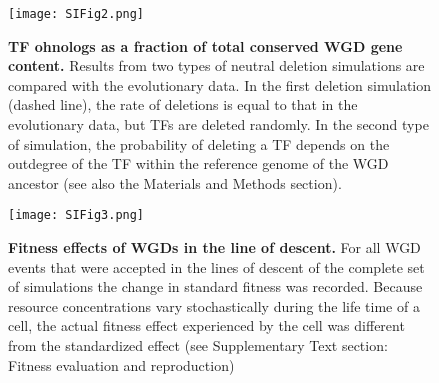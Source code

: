 \begin{figure}[htp]
 \begin{center}
 \texttt{[image: SIFig2.png]}
\end{center}
\caption{\textbf{TF ohnologs as a fraction of total conserved WGD gene content.} Results from two types of neutral deletion simulations are compared with the evolutionary data. In the first deletion simulation (dashed line), the rate of deletions is equal to that in the evolutionary data, but TFs are deleted randomly. In the second type of simulation, the probability of deleting a TF depends on the outdegree of the TF within the reference genome of the WGD ancestor (see also the Materials and Methods section).}
\label{SI:neutral_vs_K} 
\end{figure} 

\begin{figure}[htp]
 \begin{center}
 \texttt{[image: SIFig3.png]}
\end{center}
\caption{\textbf{Fitness effects of WGDs in the line of descent.} For all WGD events that were accepted in the lines of descent of the complete set of simulations the change in standard fitness was recorded. Because resource concentrations vary stochastically during the life time of a cell, the actual fitness effect experienced by the cell was different from the standardized effect (see Supplementary Text section: Fitness evaluation and reproduction) }
\label{SI:fitness_effects} 
\end{figure} 

